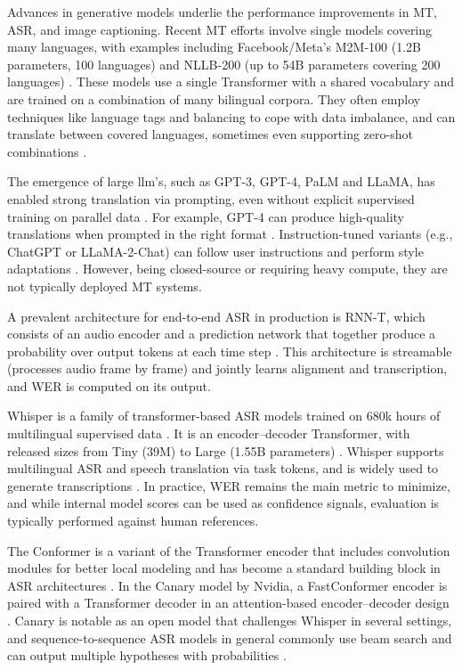 Advances in generative models underlie the performance improvements in MT, ASR, and image captioning. Recent MT efforts involve single models covering many languages, with examples including Facebook/Meta’s M2M-100 (1.2B parameters, 100 languages) and NLLB-200 (up to 54B parameters covering 200 languages) \cite{fan2021m2m100,nllb2022}. These models use a single Transformer with a shared vocabulary and are trained on a combination of many bilingual corpora. They often employ techniques like language tags and balancing to cope with data imbalance, and can translate between covered languages, sometimes even supporting zero-shot combinations \cite{fan2021m2m100,nllb2022}.

The emergence of large \gls{llm}'s, such as GPT-3, GPT-4, PaLM and LLaMA, has enabled strong translation via prompting, even without explicit supervised training on parallel data \cite{brown2020gpt3,openai2023gpt4,chowdhery2022palm,touvron2023llama}. For example, GPT-4 can produce high-quality translations when prompted in the right format \cite{openai2023gpt4}. Instruction-tuned variants (e.g., ChatGPT or LLaMA-2-Chat) can follow user instructions and perform style adaptations \cite{touvron2023llama2}. However, being closed-source or requiring heavy compute, they are not typically deployed MT systems.

A prevalent architecture for end-to-end ASR in production is RNN-T, which consists of an audio encoder and a prediction network that together produce a probability over output tokens at each time step \cite{graves2012rnnt}. This architecture is streamable (processes audio frame by frame) and jointly learns alignment and transcription, and WER is computed on its output.

Whisper is a family of transformer-based ASR models trained on 680k hours of multilingual supervised data \cite{radford2023whisper}. It is an encoder--decoder Transformer, with released sizes from Tiny (39M) to Large (1.55B parameters) \cite{radford2023whisper}. Whisper supports multilingual ASR and speech translation via task tokens, and is widely used to generate transcriptions \cite{radford2023whisper}. In practice, WER remains the main metric to minimize, and while internal model scores can be used as confidence signals, evaluation is typically performed against human references.

The Conformer is a variant of the Transformer encoder that includes convolution modules for better local modeling and has become a standard building block in ASR architectures \cite{gulati2020conformer}. In the Canary model by Nvidia, a FastConformer encoder is paired with a Transformer decoder in an attention-based encoder--decoder design \cite{nvidia2024lessismore}. Canary is notable as an open model that challenges Whisper in several settings, and sequence-to-sequence ASR models in general commonly use beam search and can output multiple hypotheses with probabilities \cite{nvidia2024lessismore}.

